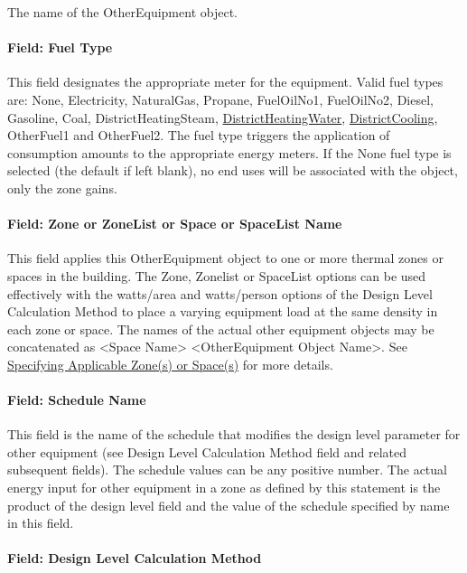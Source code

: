 The name of the OtherEquipment object.

\paragraph{Field: Fuel Type}\label{field-fuel-use-type}

This field designates the appropriate meter for the equipment. Valid fuel types are: None, Electricity, NaturalGas, Propane, FuelOilNo1, FuelOilNo2, Diesel, Gasoline, Coal, DistrictHeatingSteam, \hyperref[districtheating]{DistrictHeatingWater}, \hyperref[districtcooling]{DistrictCooling}, OtherFuel1 and OtherFuel2. The fuel type triggers the application of consumption amounts to the appropriate energy meters. If the None fuel type is selected (the default if left blank), no end uses will be associated with the object, only the zone gains.

\paragraph{Field: Zone or ZoneList or Space or SpaceList Name}\label{othereq-field-zone-or-zonelist-name-000}

This field applies this OtherEquipment object to one or more thermal zones or spaces in the building. The Zone, Zonelist or SpaceList options can be used effectively with the watts/area and watts/person options of the Design Level Calculation Method to place a varying equipment load at the same density in each zone or space. The names of the actual other equipment objects may be concatenated as \textless{}Space Name\textgreater{} \textless{}OtherEquipment Object Name\textgreater{}. See \hyperref[specifying-applicable-zones-or-spaces]{Specifying Applicable Zone(s) or Space(s)} for more details.

\paragraph{Field: Schedule Name}\label{field-schedule-name-5-000}

This field is the name of the schedule that modifies the design level parameter for other equipment (see Design Level Calculation Method field and related subsequent fields). The schedule values can be any positive number. The actual energy input for other equipment in a zone as defined by this statement is the product of the design level field and the value of the schedule specified by name in this field.

\paragraph{Field: Design Level Calculation Method}\label{field-design-level-calculation-method-5}

